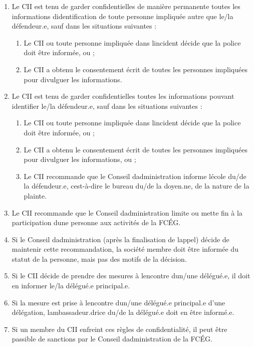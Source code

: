 \begin{enumerate}
 \item
  Le CII est tenu de garder confidentielles de manière permanente toutes les informations d\textquotesingle identification de toute personne impliquée autre que le/la défendeur.e, sauf dans les situations suivantes :

  \begin{enumerate}
   \item
    Le CII ou toute personne impliquée dans l\textquotesingle incident décide que la police doit être informée, ou ;
   \item
    Le CII a obtenu le consentement écrit de toutes les personnes impliquées pour divulguer les informations.
  \end{enumerate}
 \item
  Le CII est tenu de garder confidentielles toutes les informations pouvant identifier le/la défendeur.e, sauf dans les situations suivantes :

  \begin{enumerate}
   \item
    Le CII ou toute personne impliquée dans l\textquotesingle incident décide que la police doit être informée, ou ;
   \item
    Le CII a obtenu le consentement écrit de toutes les personnes impliquées pour divulguer les informations, ou ;
   \item
    Le CII recommande que le Conseil d\textquotesingle administration informe l\textquotesingle école du/de la défendeur.e, c\textquotesingle est-à-dire le bureau du/de la doyen.ne, de la nature de la plainte.
  \end{enumerate}
 \item
  Le CII recommande que le Conseil d\textquotesingle administration limite ou mette fin à la participation d\textquotesingle une personne aux activités de la FCÉG.
 \item
  Si le Conseil d\textquotesingle administration (après la finalisation de l\textquotesingle appel) décide de maintenir cette recommandation, la société membre doit être informée du statut de la personne, mais pas des motifs de la décision.
 \item
  Si le CII décide de prendre des mesures à l\textquotesingle encontre d\textquotesingle un/une délégué.e, il doit en informer le/la délégué.e principal.e.
 \item
  Si la mesure est prise à l\textquotesingle encontre d\textquotesingle un/une délégué.e principal.e d'une délégation, l\textquotesingle ambassadeur.drice du/de la délégué.e doit en être informé.e.
 \item
  Si un membre du CII enfreint ces règles de confidentialité, il peut être passible de sanctions par le Conseil d\textquotesingle administration de la FCÉG.
\end{enumerate}

